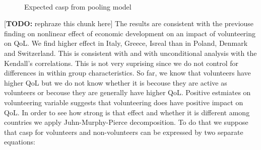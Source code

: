 \documentclass[10pt, letterpaper]{article}
\begin{document}
\begin{spacing}{1.4}
\begin{figure}[H]
\centering
\caption{Expected casp from pooling model } 
\label{fig:pooling1}
\begin{minipage}{1\linewidth}
\quad
{}~\\

\end{minipage}
\end{figure}


[{\bf TODO:} rephraze this chunk here] 
The results are consistent with the previouse finding on nonlinear effect of economic development on an impact of volunteering on QoL. We find higher effect in Italy, Greece, Isreal than in Poland, Denmark and Switzerland. This  is consistent with \citet{haski09} and with unconditional analysis with the Kendall's correlations. This is not very suprising since we do not control for differences in within group characteristics. So far, we know that volunteers have higher QoL but we do not know whether it is becouse they are active as volunteers or becouse they are generally have higher QoL. Positive estmiates on volunteering variable suggests that volunteering does have positive impact on QoL. In order to see how strong is that effect and whether it is different among countries we apply Juhn-Murphy-Pierce decomposition. To do that we suppose that casp for volunteers and non-volunteers can be expressed by two separate equations:


\end{spacing}
\end{document}
